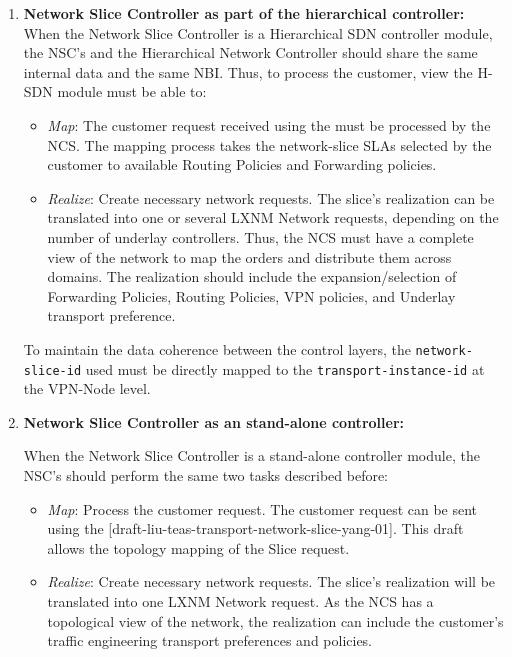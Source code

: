 \documentclass[journal,article,submit,moreauthors,pdftex]{Definitions/mdpi}
\begin{document}
\begin{enumerate}[label=(\alph*)]

\item \textbf{Network Slice Controller as part of the hierarchical controller:}
When the Network Slice Controller is a Hierarchical SDN controller module, the NSC's and the Hierarchical Network Controller should share the same internal data and the same NBI. Thus, to process the customer, view the H-SDN module must be able to:

\begin{itemize}
    \item \textit{Map}: The customer request received using the must be processed by the NCS. The mapping process takes the network-slice SLAs selected by the customer to available Routing Policies and Forwarding policies.
    
    \item  \textit{Realize}: Create necessary network requests. The slice's realization can be translated into one or several LXNM Network requests, depending on the number of underlay controllers. Thus, the NCS must have a complete view of the network to map the orders and distribute them across domains. The realization should include the expansion/selection of Forwarding Policies, Routing Policies, VPN policies, and Underlay transport preference.    
\end{itemize}

To maintain the data coherence between the control layers, the \texttt{network-slice-id} used  must be directly mapped to the  \texttt{transport-instance-id} at the VPN-Node level.     
    \item \textbf{Network Slice Controller as an stand-alone controller:}

When the Network Slice Controller is a stand-alone controller module, the NSC's should perform the same two tasks described before:

\begin{itemize}
    \item \textit{Map}: Process the customer request. The customer request can be sent using the [draft-liu-teas-transport-network-slice-yang-01]. This draft allows the topology mapping of the Slice request. 
    
    \item  \textit{Realize}: Create necessary network requests. The slice's realization will be translated into one LXNM Network request. As the NCS has a topological view of the network, the realization can include the customer's traffic engineering transport preferences and policies.
\end{itemize}


\end{enumerate}
\end{document}
